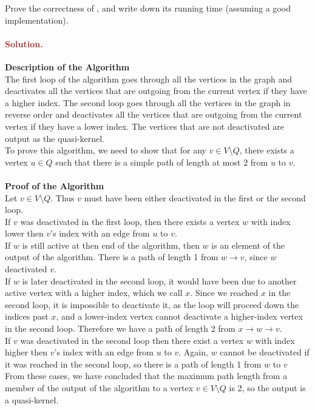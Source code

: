 Prove the correctness of , and write down its running time (assuming a good implementation).

\paragraph{\textcolor{brown}{Solution.}} \:

\textbf{Description of the Algorithm} \\
The first loop of the algorithm goes through all the vertices in the graph and deactivates all the vertices that are outgoing from the current vertex if they have a higher index. The second loop goes through all the vertices in the graph in reverse order and deactivates all the vertices that are outgoing from the current vertex if they have a lower index. The vertices that are not deactivated are output as the quasi-kernel.\\
To prove this algorithm, we need to show that for any $v \in V \setminus Q$, there exists a vertex $u \in Q$ such that there is a simple path of length at most $2$ from $u$ to $v$.\\
\\ \textbf{Proof of the Algorithm}\\
Let $v \in V \setminus Q$. Thus $v$ must have been either deactivated in the first or the second loop.\\
If $v$ was deactivated in the first loop, then there exists a vertex $w$ with index lower then $v$'s index with an edge from $u$ to $v$. \\
If $w$ is still active at then end of the algorithm, then $w$ is an element of the output of the algorithm. There is a path of length 1 from $w \to v$, since $w$ deactivated $v$. \\
If $w$ is later deactivated in the second loop, it would have been due to another active vertex with a higher index, which we call $x$. Since we reached $x$ in the second loop, it is impossible to deactivate it, as the loop will proceed down the indices past $x$, and a lower-index vertex cannot deactivate a higher-index vertex in the second loop. Therefore we have a path of length 2 from $x \to w \to v$. \\
If $v$ was deactivated in the second loop then there exist a vertex $w$ with index higher then $v$'s index with an edge from $u$ to $v$. Again, $w$ cannot be deactivated if it was reached in the second loop, so there is a path of length 1 from $w$ to $v$ \\
From these cases, we have concluded that the maximum path length from a member of the output of the algorithm to a vertex $v \in V \setminus Q$ is 2, so the output is a quasi-kernel.
